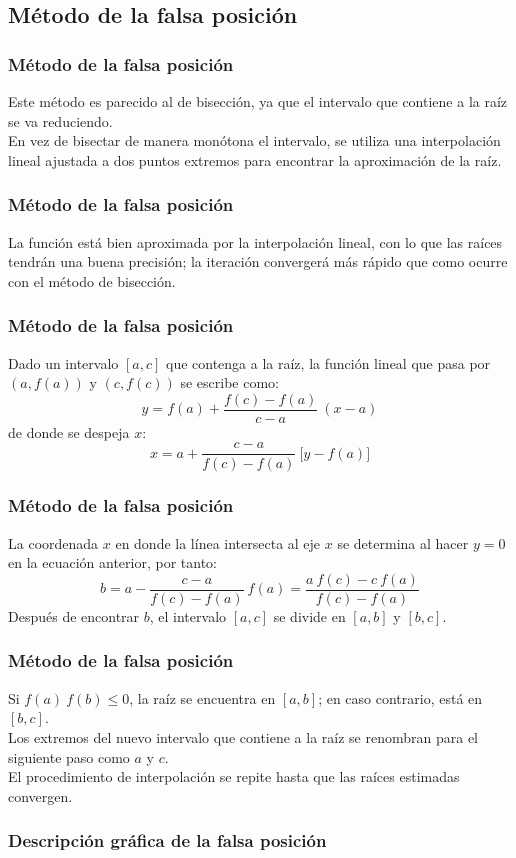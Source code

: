 \subsection{Método de la falsa posición}
\begin{frame}
\frametitle{Método de la falsa posición}
Este método es parecido al de bisección, ya que el intervalo que contiene a la raíz se va reduciendo.
\\
\bigskip
En vez de bisectar de manera monótona el intervalo, se utiliza una interpolación lineal ajustada a dos puntos extremos para encontrar la aproximación de la raíz.
\end{frame}
\begin{frame}
\frametitle{Método de la falsa posición}
La función está bien aproximada por la interpolación lineal, con lo que las raíces tendrán una buena precisión; la iteración convergerá más rápido que como ocurre con el método de bisección.
\end{frame}
\begin{frame}
\frametitle{Método de la falsa posición}	
Dado un intervalo $[a,c]$ que contenga a la raíz, la función lineal que pasa por $(a,f(a))$ y $(c,f(c))$ se escribe como:
\[ y = f(a) + \dfrac{f(c) - f(a)}{c - a} \: (x - a) \]
de donde se despeja $x$:
\[ x = a + \dfrac{c - a}{f(c) - f(a)} \: \big[ y - f(a)\big] \]
\end{frame}
\begin{frame}
\frametitle{Método de la falsa posición}
La coordenada $x$ en donde la línea intersecta al eje $x$ se determina al hacer $y=0$ en la ecuación anterior, por tanto:
\[ b = a - \dfrac{c - a}{f(c) - f(a)} \: f(a) = \dfrac{a \: f(c) - c \: f(a)}{f(c)-f(a)} \]
Después de encontrar $b$, el intervalo $[a, c]$ se divide en $[a, b]$ y $[b, c]$.
\end{frame}
\begin{frame}
\frametitle{Método de la falsa posición}
Si $f(a) \: f(b) \leq 0$, la raíz se encuentra en $[a, b]$; en caso contrario, está en $[b, c]$. 
\\
\bigskip
Los extremos del nuevo intervalo que contiene a la raíz se renombran para el siguiente paso como $a$ y $c$.
\\
\bigskip
El procedimiento de interpolación se repite hasta que las raíces estimadas convergen.
\end{frame}
\begin{frame}[fragile]
\frametitle{Descripción gráfica de la falsa posición}
\begin{figure}
	\centering
	
\end{figure}
\end{frame}
